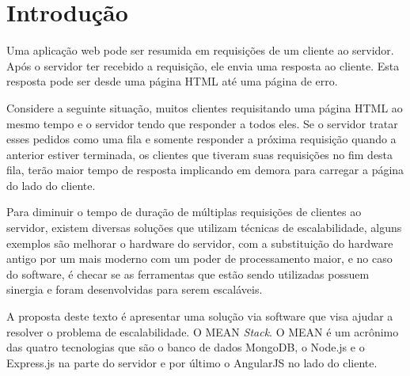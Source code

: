 \chapter{Introdu\c{c}\~ao}
\label{Introducao}

Uma aplicação web pode ser resumida em requisições de um cliente ao servidor. Após o servidor ter recebido a requisição, ele envia uma resposta ao cliente. Esta resposta pode ser desde uma página HTML até uma página de erro.

Considere a seguinte situação, muitos clientes requisitando uma página HTML ao mesmo tempo e o servidor tendo que responder a todos eles. Se o servidor tratar esses pedidos como uma fila e somente responder a próxima requisição quando a anterior estiver terminada, os clientes que tiveram suas requisições no fim desta fila, terão maior tempo de resposta implicando em demora para carregar a página do lado do cliente.

Para diminuir o tempo de duração de múltiplas requisições de clientes ao servidor, existem diversas soluções que utilizam técnicas de escalabilidade, alguns exemplos são melhorar o hardware do servidor, com a substituição do hardware antigo por um mais moderno com um poder de processamento maior, e no caso do software, é checar se as ferramentas que estão sendo utilizadas possuem sinergia e foram desenvolvidas para serem escaláveis.

A proposta deste texto é apresentar uma solução via software que visa ajudar a resolver o problema de escalabilidade. O MEAN \textit{Stack}. O MEAN é um acrônimo das quatro tecnologias que são o banco de dados MongoDB, o Node.js e o Express.js na parte do servidor e por último o AngularJS no lado do cliente.

